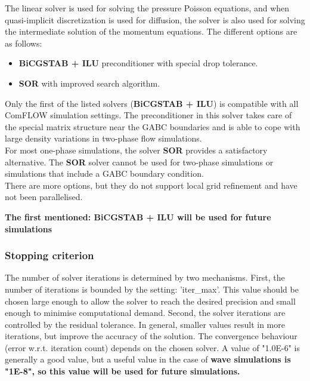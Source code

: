 The linear solver is used for solving the pressure Poisson equations, and when quasi-implicit discretization is used for diffusion, the solver is also used for solving the intermediate solution of the momentum equations. The different options are as follows:
\begin{itemize}
    \item \textbf{BiCGSTAB + ILU} preconditioner with special drop tolerance. 
    \item \textbf{SOR} with improved search algorithm. 
\end{itemize}
Only the first of the listed solvers (\textbf{BiCGSTAB + ILU}) is compatible with all ComFLOW simulation settings. The preconditioner in this solver takes care of the special matrix structure near the GABC boundaries and is able to cope with large density variations in two-phase flow simulations.\\
For most one-phase simulations, the solver \textbf{SOR} provides a satisfactory alternative. The \textbf{SOR} solver cannot be used for two-phase simulations or simulations that include a GABC boundary condition.\\
There are more options, but they do not support local grid refinement and have not been parallelised. 

\textbf{The first mentioned: BiCGSTAB + ILU will be used for future simulations}

\subsubsection{Stopping criterion}
The number of solver iterations is determined by two mechanisms. First, the number of iterations is bounded by the setting: 'iter\_max'. This value should be chosen large enough to allow the solver to reach the desired precision and small enough to minimise computational demand.  Second, the solver iterations are controlled by the residual tolerance. In general, smaller values result in more iterations, but improve the accuracy of the solution. The convergence behaviour (error w.r.t. iteration count) depends on the chosen solver. A value of "1.0E-6" is generally a good value, but a useful value in the case of \textbf{wave simulations is "1E-8", so this value will be used for future simulations.}



